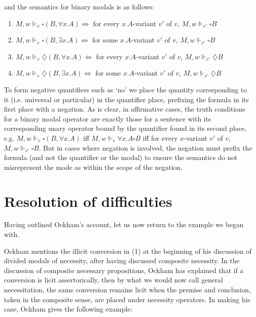 \documentclass[a4paper]{article}
\begin{document}
and the semantics for binary modals is as follows: 
\begin{enumerate}
	\item $M, w \Vdash_{v} \square(B, \forall x.A) \Leftrightarrow$ for every $x.A$-variant $v'$ of $v$, $M, w \Vdash_{v'} \square B$
	\item $M, w \Vdash_{v} \square(B, \exists x.A) \Leftrightarrow$ for some $x.A$-variant $v'$ of $v$, $M, w \Vdash _{v'} \square B$
	\item $M, w \Vdash_{v} \diamondsuit(B, \forall x.A) \Leftrightarrow$ for every $x.A$-variant $v'$ of $v$, $M, w \Vdash_{v'} \diamondsuit B$
	\item $M, w \Vdash_{v} \diamondsuit(B, \exists x.A) \Leftrightarrow$ for some $x.A$-variant $v'$ of $v$, $M, w \Vdash _{v'} \diamondsuit B$
\end{enumerate}

To form negative quantifiers such as `no' we place the quantity corresponding to it (i.e. universal or particular) in the quantifier place, prefixing the formula in its first place with a negation. As is clear, in affirmative cases, the truth conditions for a binary modal operator are exactly those for a sentence with its corresponding unary operator bound by the quantifier found in its second place, e.g. $M, w \Vdash_{v} \square(B, \forall x.A)$ iff $M, w \Vdash_{v} \forall x.A \square B$ iff for every $x$-variant $v'$ of $v$, $M, w \Vdash_{v'} \square B$. But in cases where negation is involved, the negation must prefix the formula (and not the quantifier or the modal) to ensure the semantics do not misrepresent the mode as within the scope of the negation.
\section{Resolution of difficulties}
Having outlined Ockham's account, let us now return to the example we began with. 

Ockham mentions the illicit conversion in (1) at the beginning of his discussion of divided modals of necessity, after having discussed composite necessity. In the discussion of composite necessary propositions, Ockham has explained that if a conversion is licit assertorically, then by what we would now call general necessitation, the same conversion remains licit when the premise and conclusion, taken in the composite sense, are placed under necessity operators. In making his case, Ockham gives the following example:
\end{document}
